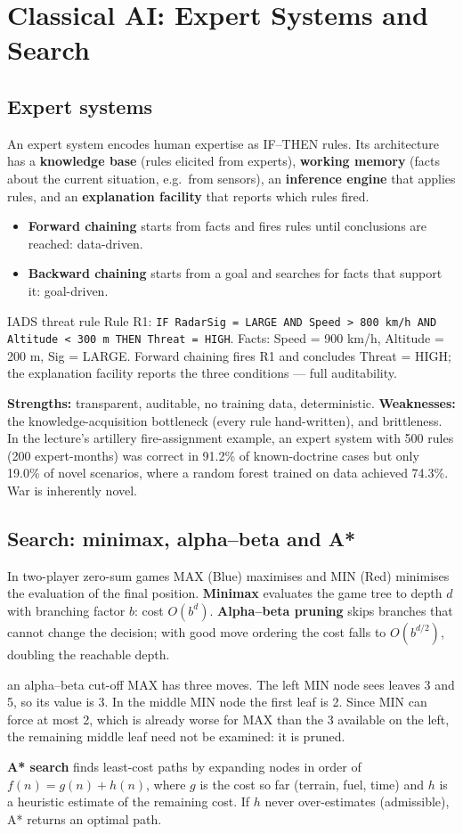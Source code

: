 \documentclass[11pt]{article}
\begin{document}
\section{Classical AI: Expert Systems and Search}
\subsection{Expert systems}
An expert system encodes human expertise as IF--THEN rules. Its architecture has a \textbf{knowledge base} (rules elicited from experts), \textbf{working memory} (facts about the current situation, e.g.\ from sensors), an \textbf{inference engine} that applies rules, and an \textbf{explanation facility} that reports which rules fired.
\begin{itemize}
\item \textbf{Forward chaining} starts from facts and fires rules until conclusions are reached: data-driven.
\item \textbf{Backward chaining} starts from a goal and searches for facts that support it: goal-driven.
\end{itemize}
\begin{example}{IADS threat rule}
Rule R1: \texttt{IF RadarSig = LARGE AND Speed > 800 km/h AND Altitude < 300 m THEN Threat = HIGH}. Facts: Speed = 900 km/h, Altitude = 200 m, Sig = LARGE. Forward chaining fires R1 and concludes Threat = HIGH; the explanation facility reports the three conditions --- full auditability.
\end{example}
\textbf{Strengths:} transparent, auditable, no training data, deterministic. \textbf{Weaknesses:} the knowledge-acquisition bottleneck (every rule hand-written), and brittleness. In the lecture's artillery fire-assignment example, an expert system with 500 rules (200 expert-months) was correct in 91.2\% of known-doctrine cases but only 19.0\% of novel scenarios, where a random forest trained on data achieved 74.3\%. War is inherently novel.

\subsection{Search: minimax, alpha--beta and A*}
In two-player zero-sum games MAX (Blue) maximises and MIN (Red) minimises the evaluation of the final position. \textbf{Minimax} evaluates the game tree to depth $d$ with branching factor $b$: cost $O(b^d)$. \textbf{Alpha--beta pruning} skips branches that cannot change the decision; with good move ordering the cost falls to $O(b^{d/2})$, doubling the reachable depth.
\begin{example}{an alpha--beta cut-off}
MAX has three moves. The left MIN node sees leaves 3 and 5, so its value is 3. In the middle MIN node the first leaf is 2. Since MIN can force at most 2, which is already worse for MAX than the 3 available on the left, the remaining middle leaf need not be examined: it is pruned.
\end{example}
\textbf{A* search} finds least-cost paths by expanding nodes in order of $f(n)=g(n)+h(n)$, where $g$ is the cost so far (terrain, fuel, time) and $h$ is a heuristic estimate of the remaining cost. If $h$ never over-estimates (admissible), A* returns an optimal path.
\end{document}
